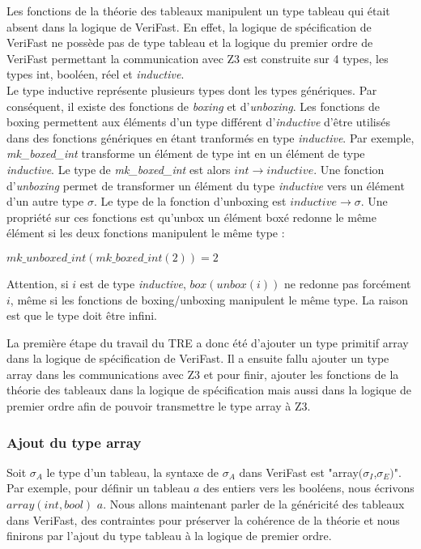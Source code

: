 \documentclass[11pt,openany]{article}
\newcommand{\verifast}{VeriFast}
\begin{document}
	Les fonctions de la th\'eorie des tableaux manipulent un type tableau qui \'etait absent dans la logique de \verifast{}. En effet, la logique de sp\'ecification de \verifast{} ne poss\`ede pas de type tableau et la logique du premier ordre de \verifast{} permettant la communication avec Z3 est construite sur 4 types, les types int, bool\'een, r\'eel et \textit{inductive}.\\
	Le type inductive repr\'esente plusieurs types dont les types g\'en\'eriques. Par cons\'equent, il existe des fonctions de \textit{boxing} et d'\textit{unboxing}. Les fonctions de boxing permettent aux \'el\'ements d'un type diff\'erent d'\textit{inductive} d'\^etre utilis\'es dans des fonctions g\'en\'eriques en \'etant tranform\'es en type \textit{inductive}. Par exemple, \textit{mk_boxed_int} transforme un \'el\'ement de type int en un \'el\'ement de type \textit{inductive}. Le type de \textit{mk_boxed_int} est alors $int \rightarrow inductive$. Une fonction d'\textit{unboxing} permet de transformer un \'el\'ement du type \textit{inductive} vers un \'el\'ement d'un autre type $\sigma$. Le type de la fonction d'unboxing est $inductive \rightarrow \sigma$. Une propri\'et\'e sur ces fonctions est qu'unbox un \'el\'ement box\'e redonne le m\^eme \'el\'ement si les deux fonctions manipulent le m\^eme type :
	\begin{center}
		$mk\_unboxed\_int(mk\_boxed\_int(2)) = 2$
	\end{center}
	Attention, si $i$ est de type \textit{inductive}, $box(unbox(i))$ ne redonne pas forc\'ement $i$, m\^eme si les fonctions de boxing/unboxing manipulent le m\^eme type. La raison est que le type doit \^etre infini.
	 
	La premi\`ere \'etape du travail du TRE a donc \'et\'e d'ajouter un type primitif array dans la logique de sp\'ecification de \verifast{}. Il a ensuite fallu ajouter un type array dans les communications avec Z3 et pour finir, ajouter les fonctions de la th\'eorie des tableaux dans la logique de sp\'ecification mais aussi dans la logique de premier ordre afin de pouvoir transmettre le type array \`a Z3.
		\subsubsection{Ajout du type array}
		Soit $\sigma_A$ le type d'un tableau, la syntaxe de $\sigma_A$ dans \verifast{} est "array$(\sigma_I$,$\sigma_E)$". Par exemple, pour d\'efinir un tableau $a$ des entiers vers les bool\'eens, nous \'ecrivons $array(int,bool)$ $a$. Nous allons maintenant parler de la g\'en\'ericit\'e des tableaux dans \verifast{}, des contraintes pour pr\'eserver la coh\'erence de la th\'eorie et nous finirons par l'ajout du type tableau \`a la logique de premier ordre.
\end{document}
